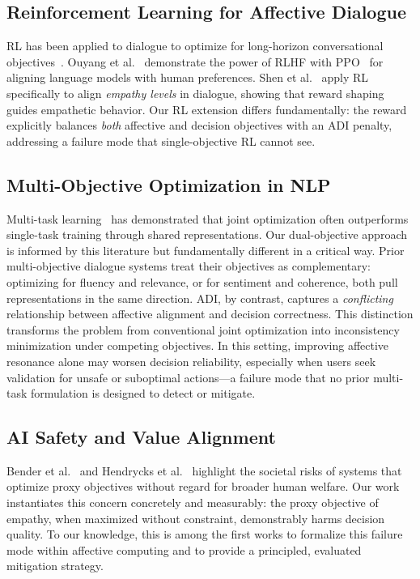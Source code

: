 \documentclass[lettersize,journal]{IEEEtran}
\begin{document}
\subsection{Reinforcement Learning for Affective Dialogue}
RL has been applied to dialogue to optimize for long-horizon conversational
objectives~\cite{li2016rl}.  Ouyang et al.~\cite{ouyang2022instructgpt}
demonstrate the power of RLHF with PPO~\cite{schulman2017ppo} for aligning
language models with human preferences.  Shen et al.~\cite{shen2022empathy}
apply RL specifically to align \emph{empathy levels} in dialogue, showing
that reward shaping guides empathetic behavior.  Our RL extension differs
fundamentally: the reward explicitly balances \emph{both} affective and
decision objectives with an ADI penalty, addressing a failure mode that
single-objective RL cannot see.

\subsection{Multi-Objective Optimization in NLP}
Multi-task learning~\cite{caruana1997multitask,liu2019mtdnn} has
demonstrated that joint optimization often outperforms single-task training
through shared representations.  Our dual-objective approach is informed by
this literature but fundamentally different in a critical way.  Prior
multi-objective dialogue systems treat their objectives as complementary:
optimizing for fluency and relevance, or for sentiment and coherence, both
pull representations in the same direction.  ADI, by contrast, captures a
\emph{conflicting} relationship between affective alignment and decision
correctness.  This distinction transforms the problem from conventional joint
optimization into inconsistency minimization under competing objectives.  In
this setting, improving affective resonance alone may worsen decision
reliability, especially when users seek validation for unsafe or suboptimal
actions—a failure mode that no prior multi-task formulation is designed to
detect or mitigate.

\subsection{AI Safety and Value Alignment}
Bender et al.~\cite{bender2021parrots} and Hendrycks et
al.~\cite{hendrycks2021values} highlight the societal risks of systems that
optimize proxy objectives without regard for broader human welfare.  Our work
instantiates this concern concretely and measurably: the proxy objective of
empathy, when maximized without constraint, demonstrably harms decision
quality.  To our knowledge, this is among the first works to formalize this
failure mode within affective computing and to provide a principled, evaluated
mitigation strategy.
\end{document}

